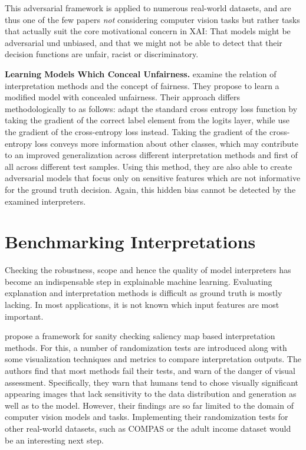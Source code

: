 \documentclass[sigconf]{acmart}
\newcommand{\mypar}[1]{\vspace{0.2cm}\noindent\textbf{#1}}
\begin{document}
This adversarial framework is applied to numerous real-world datasets, and are thus one of the few papers \textit{not} considering computer vision tasks but rather tasks that actually suit the core motivational concern in XAI: That models might be adversarial und unbiased, and that we might not be able to detect that their decision functions are unfair, racist or discriminatory. 

\mypar{Learning Models Which Conceal Unfairness.}
\cite{dimanov2020you} examine the relation of interpretation methods and the concept of fairness. They propose to learn a modified model with concealed unfairness. Their approach differs methodologically to \cite{fooling_nn_interpreters} as follows: 
\cite{fooling_nn_interpreters} adapt the standard cross entropy loss function by taking the gradient of the correct label element from the logits layer, while \cite{dimanov2020you} use the gradient of the cross-entropy loss instead. 
Taking the gradient of the cross-entropy loss conveys more information about other classes, which may contribute to an improved generalization across different interpretation methods and first of all across different test samples. 
Using this method, they are also able to create adversarial models that focus only on sensitive features which are not informative for the ground truth decision. Again, this hidden bias cannot be detected by the examined interpreters. 


% 
\section{Benchmarking Interpretations}
\label{sec:benchmarking}

Checking the robustness, scope and hence the quality of model interpreters has become an indispensable step in explainable machine learning. 
Evaluating explanation and interpretation methods is difficult as ground truth is mostly lacking. In most applications, it is not known which input features are most important. 

\cite{adebayo2018sanity} propose a framework for sanity checking saliency map based interpretation methods. For this, a number of randomization tests are introduced along with some visualization techniques and metrics to compare interpretation outputs. The authors find that most methods fail their tests, and warn of the danger of visual assessment. Specifically, they warn that humans tend to chose visually significant appearing images that lack sensitivity to the data distribution and generation as well as to the model. 
However, their findings are so far limited to the domain of computer vision models and tasks. %
Implementing their randomization tests for other real-world datasets, such as COMPAS \cite{compas_dataset} or the adult income dataset \cite{adult_income} would be an interesting next step. 
\end{document}
